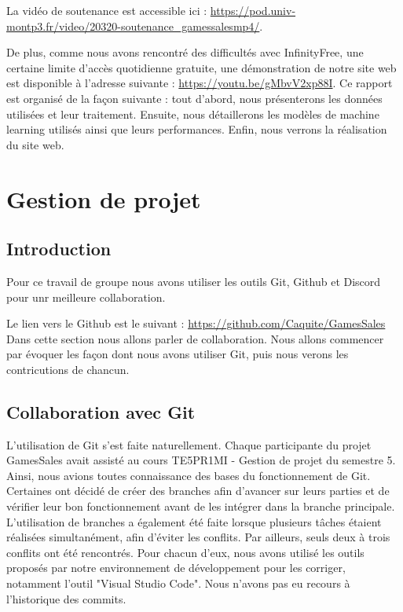 \documentclass[mstat,12pt]{unswthesis}
\begin{document}
La vidéo de soutenance est accessible ici : \url{https://pod.univ-montp3.fr/video/20320-soutenance_gamessalesmp4/}.

De plus, comme nous avons rencontré des difficultés avec InfinityFree, une certaine limite d’accès quotidienne gratuite, une démonstration de notre site web
est disponible à l’adresse suivante : \url{https://youtu.be/gMbvV2xp88I}. Ce rapport est organisé de la façon suivante : tout d’abord, nous présenterons les
données utilisées et leur traitement. Ensuite, nous détaillerons les modèles de machine learning utilisés ainsi que leurs performances. Enfin,
nous verrons la réalisation du site web.


\hypertarget{Gestion-de-projet}{%
\chapter{\textbf{Gestion de projet }}\label{chapGestionProjet}}

\hypertarget{IntroductionGestionProjet}{%
\section{\textbf{Introduction}}\label{IntroGestionProjet}}

Pour ce travail de groupe nous avons utiliser les outils Git, Github et Discord pour
unr meilleure collaboration.

Le lien vers le Github est le suivant : \url{https://github.com/Caquite/GamesSales} \\

Dans cette section nous allons parler de collaboration. Nous allons commencer par évoquer les
façon dont nous avons utiliser Git, puis nous verons les contricutions de chancun.


\hypertarget{collaborationGit}{%
\section{\textbf{Collaboration avec Git}}\label{collaborationGit}}

L'utilisation de Git s'est faite naturellement. Chaque participante du projet GamesSales avait assisté au cours TE5PR1MI - Gestion de projet du semestre 5.
Ainsi, nous avions toutes connaissance des bases du fonctionnement de Git. Certaines ont décidé de créer des branches afin d’avancer sur leurs parties et de vérifier
leur bon fonctionnement avant de les intégrer dans la branche principale. L’utilisation de branches a également été faite lorsque plusieurs tâches étaient réalisées
simultanément, afin d’éviter les conflits.
Par ailleurs, seuls deux à trois conflits ont été rencontrés. Pour chacun d’eux, nous avons utilisé les outils
proposés par notre environnement de développement pour les corriger, notamment l'outil "Visual Studio Code".
Nous n’avons pas eu recours à l’historique des commits.
\end{document}
